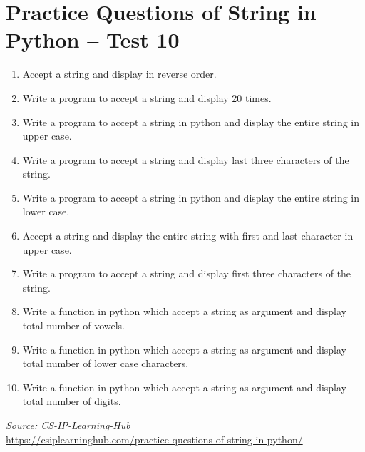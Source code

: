 \documentclass[12pt,a4paper]{article}
\begin{document}
\section{Practice Questions of String in Python -- Test 10}

\begin{enumerate}[label=\textbf{Q\arabic*.}]

\item Accept a string and display in reverse order.

\item Write a program to accept a string and display 20 times.

\item Write a program to accept a string in python and display the entire string in upper case.

\item Write a program to accept a string and display last three characters of the string.

\item Write a program to accept a string in python and display the entire string in lower case.

\item Accept a string and display the entire string with first and last character in upper case.

\item Write a program to accept a string and display first three characters of the string.

\item Write a function in python which accept a string as argument and display total number of vowels.

\item Write a function in python which accept a string as argument and display total number of lower case characters.

\item Write a function in python which accept a string as argument and display total number of digits.

\end{enumerate}

\vspace{1cm}
\begin{center}
\textit{Source: CS-IP-Learning-Hub}\\
\url{https://csiplearninghub.com/practice-questions-of-string-in-python/}
\end{center}
\end{document}
